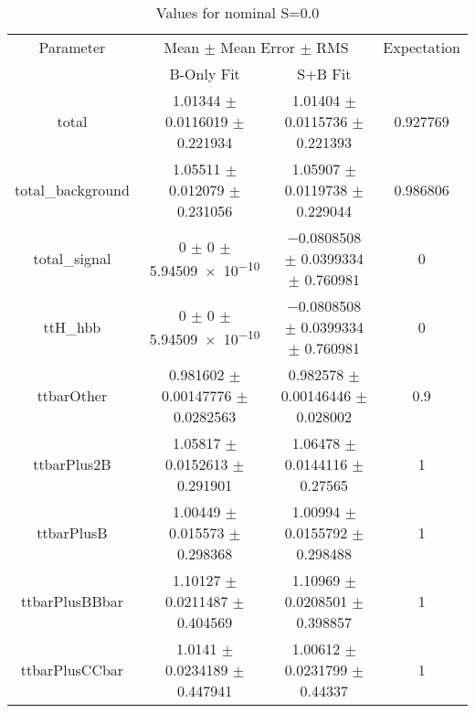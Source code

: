 \begin{table}
\centering
\caption{Values for nominal S=0.0}
\begin{tabular}{cccc}
\toprule
Parameter & \multicolumn{2}{c}{Mean $\pm$ Mean Error $\pm$ RMS} & Expectation\\
 & B-Only Fit & S+B Fit & \\
\midrule
total & \num{1.01344} $\pm$ \num{0.0116019} $\pm$ \num{0.221934} & \num{1.01404} $\pm$ \num{0.0115736} $\pm$ \num{0.221393} & \num{0.927769}\\
total\_background & \num{1.05511} $\pm$ \num{0.012079} $\pm$ \num{0.231056} & \num{1.05907} $\pm$ \num{0.0119738} $\pm$ \num{0.229044} & \num{0.986806}\\
total\_signal & \num{0} $\pm$ \num{0} $\pm$ \num{5.94509e-10} & \num{-0.0808508} $\pm$ \num{0.0399334} $\pm$ \num{0.760981} & \num{0}\\
ttH\_hbb & \num{0} $\pm$ \num{0} $\pm$ \num{5.94509e-10} & \num{-0.0808508} $\pm$ \num{0.0399334} $\pm$ \num{0.760981} & \num{0}\\
ttbarOther & \num{0.981602} $\pm$ \num{0.00147776} $\pm$ \num{0.0282563} & \num{0.982578} $\pm$ \num{0.00146446} $\pm$ \num{0.028002} & \num{0.9}\\
ttbarPlus2B & \num{1.05817} $\pm$ \num{0.0152613} $\pm$ \num{0.291901} & \num{1.06478} $\pm$ \num{0.0144116} $\pm$ \num{0.27565} & \num{1}\\
ttbarPlusB & \num{1.00449} $\pm$ \num{0.015573} $\pm$ \num{0.298368} & \num{1.00994} $\pm$ \num{0.0155792} $\pm$ \num{0.298488} & \num{1}\\
ttbarPlusBBbar & \num{1.10127} $\pm$ \num{0.0211487} $\pm$ \num{0.404569} & \num{1.10969} $\pm$ \num{0.0208501} $\pm$ \num{0.398857} & \num{1}\\
ttbarPlusCCbar & \num{1.0141} $\pm$ \num{0.0234189} $\pm$ \num{0.447941} & \num{1.00612} $\pm$ \num{0.0231799} $\pm$ \num{0.44337} & \num{1}\\
\bottomrule
\end{tabular}
\end{table}
